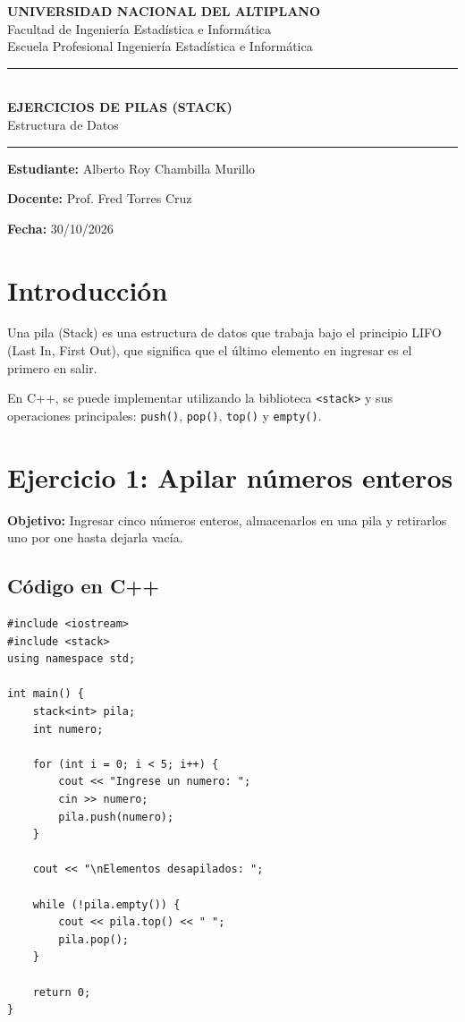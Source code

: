 \documentclass[12pt,a4paper]{article}
\begin{document}
\begin{center}
    {\Large \textbf{UNIVERSIDAD NACIONAL DEL ALTIPLANO}}\\[0.3cm]
    {\large Facultad de Ingeniería Estadística e Informática}\\[0.2cm]
    {\large Escuela Profesional Ingeniería Estadística e Informática}\\[1cm]

    \rule{\textwidth}{0.5pt}\\[0.4cm]
    {\LARGE \textbf{EJERCICIOS DE PILAS (STACK)}}\\[0.3cm]
    {\large Estructura de Datos}\\[0.4cm]
    \rule{\textwidth}{0.5pt}
\end{center}

\vspace{0.8cm}

\noindent
\textbf{Estudiante:} Alberto Roy Chambilla Murillo

\vspace{0.3cm}
\noindent
\textbf{Docente:} Prof. Fred Torres Cruz

\vspace{0.3cm}
\noindent
\textbf{Fecha:} 30/10/2026

\section*{Introducción}

Una pila (Stack) es una estructura de datos que trabaja bajo
el principio LIFO (Last In, First Out), que significa que el
último elemento en ingresar es el primero en salir.

En C++, se puede implementar utilizando la biblioteca
\texttt{<stack>} y sus operaciones principales:
\texttt{push()}, \texttt{pop()}, \texttt{top()} y
\texttt{empty()}.

\section{Ejercicio 1: Apilar números enteros}

\textbf{Objetivo:} Ingresar cinco números enteros,
almacenarlos en una pila y retirarlos uno por one
hasta dejarla vacía.

\subsection*{Código en C++}

\begin{lstlisting}[style=cppstyle]
#include <iostream>
#include <stack>
using namespace std;

int main() {
    stack<int> pila;
    int numero;

    for (int i = 0; i < 5; i++) {
        cout << "Ingrese un numero: ";
        cin >> numero;
        pila.push(numero);
    }

    cout << "\nElementos desapilados: ";

    while (!pila.empty()) {
        cout << pila.top() << " ";
        pila.pop();
    }

    return 0;
}
\end{lstlisting}
\end{document}
